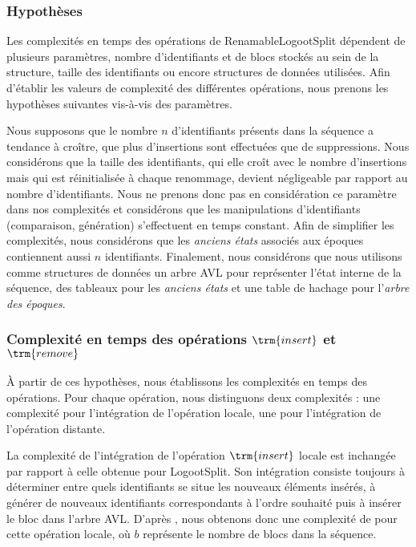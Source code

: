 \label{sec:validation-time-complexity}

\subsubsection{Hypothèses}

Les complexités en temps des opérations de RenamableLogootSplit dépendent de plusieurs paramètres, \eg nombre d'identifiants et de blocs stockés au sein de la structure, taille des identifiants ou encore structures de données utilisées.
Afin d'établir les valeurs de complexité des différentes opérations, nous prenons les hypothèses suivantes vis-à-vis des paramètres.

Nous supposons que le nombre $n$ d'identifiants présents dans la séquence a tendance à croître, \ie que plus d'insertions sont effectuées que de suppressions.
Nous considérons que la taille des identifiants, qui elle croît avec le nombre d'insertions mais qui est réinitialisée à chaque renommage, devient négligeable par rapport au nombre d'identifiants.
Nous ne prenons donc pas en considération ce paramètre dans nos complexités et considérons que les manipulations d'identifiants (comparaison, génération) s'effectuent en temps constant.
Afin de simplifier les complexités, nous considérons que les \emph{anciens états} associés aux époques contiennent aussi $n$ identifiants.
Finalement, nous considérons que nous utilisons comme structures de données un arbre AVL pour représenter l'état interne de la séquence, des tableaux pour les \emph{anciens états} et une table de hachage pour l'\emph{arbre des époques}.

\subsubsection{Complexité en temps des opérations $\trm{insert}$ et $\trm{remove}$}

À partir de ces hypothèses, nous établissons les complexités en temps des opérations.
Pour chaque opération, nous distinguons deux complexités : une complexité pour l'intégration de l'opération locale, une pour l'intégration de l'opération distante.

La complexité de l'intégration de l'opération $\trm{insert}$ locale est inchangée par rapport à celle obtenue pour LogootSplit.
Son intégration consiste toujours à déterminer entre quels identifiants se situe les nouveaux éléments insérés, à générer de nouveaux identifiants correspondants à l'ordre souhaité puis à insérer le bloc dans l'arbre AVL.
D'après \cite{2013-logootsplit}, nous obtenons donc une complexité de  pour cette opération locale, où $b$ représente le nombre de blocs dans la séquence.

